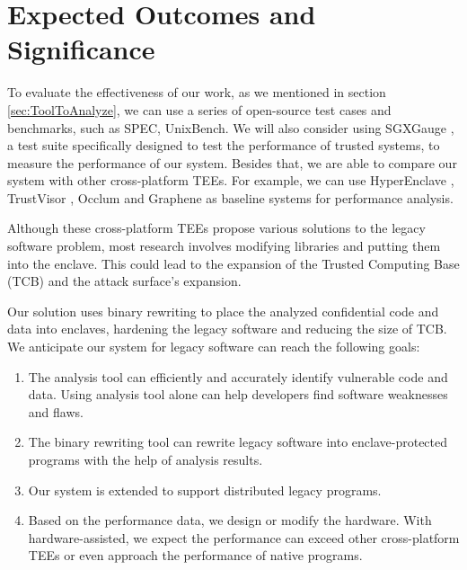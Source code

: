 \section{Expected Outcomes and Significance}
To evaluate the effectiveness of our work, as we mentioned in section
\ref{sec:ToolToAnalyze}, we can use a series of open-source test cases and benchmarks,
such as SPEC, UnixBench.
We will also consider using SGXGauge \cite{Kumar2022ACB}, a test suite specifically
designed to test the performance of trusted systems, to measure the performance
of our system.
Besides that, we are able to compare our system with other cross-platform TEEs.
For example, we can use HyperEnclave \cite{Jia2022HyperEnclaveAO}, TrustVisor
\cite{McCune2010TrustVisorET}, Occlum \cite{Shen2020OcclumSA} and Graphene
\cite{Tsai2017GrapheneSGXAP} as baseline systems for performance analysis.

Although these cross-platform TEEs propose various solutions to the legacy
software problem, most research involves modifying libraries and putting
them into the enclave.
This could lead to the expansion of the Trusted Computing Base (TCB)
and the attack surface's expansion.

Our solution uses binary rewriting to place the analyzed confidential code and data
into enclaves, hardening the legacy software and reducing the size of TCB.
We anticipate our system for legacy software can reach the following goals:
\begin{enumerate}[(1)]
    \item The analysis tool can efficiently and accurately identify vulnerable code and data.
    Using analysis tool alone can help developers find software weaknesses and flaws.
    \item The binary rewriting tool can rewrite legacy software into enclave-protected programs
    with the help of analysis results.
    \item Our system is extended to support distributed legacy programs.
    \item Based on the performance data, we design or modify the hardware.
    With hardware-assisted, we expect the performance can exceed other cross-platform TEEs
    or even approach the performance of native programs.
\end{enumerate}